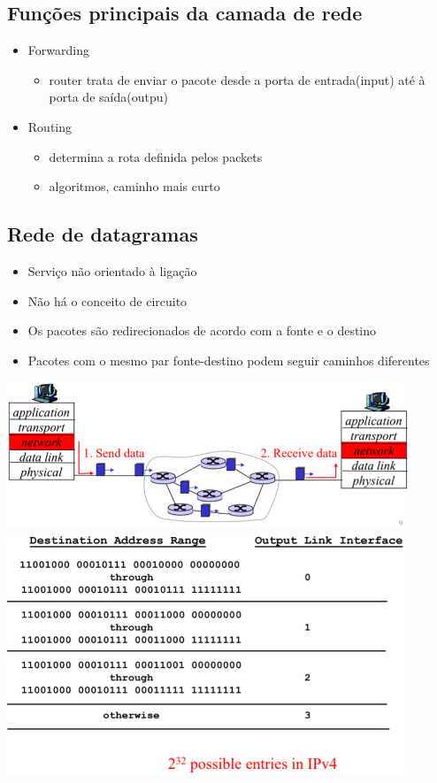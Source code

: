 \documentclass[../resumosRCOM.tex]{subfiles}
\begin{document}
\subsection{Funções principais da camada de rede}

\begin{itemize}
    \item Forwarding
    \begin{itemize}
        \item router trata de enviar o pacote desde a porta de entrada(input) até à porta de saída(outpu)
    \end{itemize}
    \item Routing
    \begin{itemize}
        \item determina a rota definida pelos packets
        \item algoritmos, caminho mais curto
    \end{itemize}
\end{itemize}

\subsection{Rede de datagramas}
\begin{itemize}
    \item Serviço não orientado à ligação
	\item Não há o conceito de circuito
	\item Os pacotes são redirecionados de acordo com a fonte e o destino
	\item Pacotes com o mesmo par fonte-destino podem seguir caminhos diferentes
\end{itemize}
\begin{center}            
    \includegraphics[width=12cm]{images/RCOM2.png}
    \includegraphics[width=12cm]{images/RCOM3.png}
\end{center}
\end{document}
